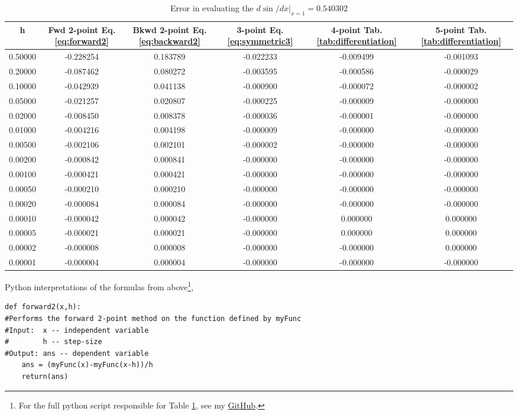 \documentclass[10pt]{article}
\begin{document}
\begin{table}[!ht]
	\begin{center}
	\caption{Error in evaluating the $d \sin /dx|_{x=1}=0.540302$}
		\label{tab:diff_errors}
		\begin{tabular}{cccccc}
		\hline
		h & Fwd 2-point Eq. \ref{eq:forward2} & Bkwd 2-point Eq. \ref{eq:backward2} & 3-point Eq. \ref{eq:symmetric3} & 4-point Tab. \ref{tab:differentiation} & 5-point Tab. \ref{tab:differentiation} \\
		\hline
0.50000&-0.228254&0.183789&-0.022233&-0.009499&-0.001093\\ 
0.20000&-0.087462&0.080272&-0.003595&-0.000586&-0.000029\\ 
0.10000&-0.042939&0.041138&-0.000900&-0.000072&-0.000002\\ 
0.05000&-0.021257&0.020807&-0.000225&-0.000009&-0.000000\\ 
0.02000&-0.008450&0.008378&-0.000036&-0.000001&-0.000000\\ 
0.01000&-0.004216&0.004198&-0.000009&-0.000000&-0.000000\\ 
0.00500&-0.002106&0.002101&-0.000002&-0.000000&-0.000000\\ 
0.00200&-0.000842&0.000841&-0.000000&-0.000000&-0.000000\\ 
0.00100&-0.000421&0.000421&-0.000000&-0.000000&-0.000000\\ 
0.00050&-0.000210&0.000210&-0.000000&-0.000000&-0.000000\\ 
0.00020&-0.000084&0.000084&-0.000000&-0.000000&-0.000000\\ 
0.00010&-0.000042&0.000042&-0.000000&0.000000&0.000000\\ 
0.00005&-0.000021&0.000021&-0.000000&0.000000&0.000000\\ 
0.00002&-0.000008&0.000008&-0.000000&-0.000000&0.000000\\ 
0.00001&-0.000004&0.000004&-0.000000&-0.000000&-0.000000\\ 
\hline
		\end{tabular}
	\end{center}
\end{table}
Python interpretations of the formulas from above\footnote{For the full python script responsible for Table \ref{tab:diff_errors}, see my \href{https://github.com/jmelahman/computational-physics-solutions/blob/master/exercises_python/exercise1_1.py}{GitHub}.},

\begin{lstlisting}
def forward2(x,h):
#Performs the forward 2-point method on the function defined by myFunc
#Input:  x -- independent variable
#        h -- step-size
#Output: ans -- dependent variable
    ans = (myFunc(x)-myFunc(x-h))/h
    return(ans)
\end{lstlisting}
\end{document}
